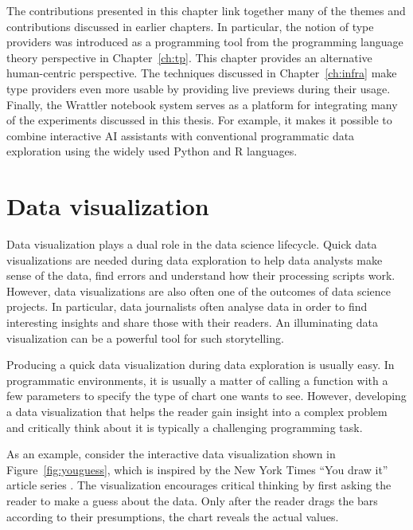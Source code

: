 \documentclass[fleqn,11pt]{report}
\theoremstyle{definition}
\begin{document}
The contributions presented in this chapter link together many of the themes and contributions
discussed in earlier chapters. In particular, the notion of type providers was introduced
as a programming tool from the programming language theory perspective in Chapter~\ref{ch:tp}.
This chapter provides an alternative human-centric perspective. The techniques discussed
in Chapter~\ref{ch:infra} make type providers even more usable by providing live previews during
their usage. Finally, the Wrattler notebook system serves as a platform for integrating
many of the experiments discussed in this thesis. For example, it makes it possible to combine
interactive AI assistants with conventional programmatic data exploration using the widely
used Python and R languages.



\chapter{Data visualization}

Data visualization plays a dual role in the data science lifecycle. Quick data
visualizations are needed during data exploration to help data analysts make sense of the
data, find errors and understand how their processing scripts work. However, data visualizations
are also often one of the outcomes of data science projects. In particular, data journalists
often analyse data in order to find interesting insights and share those with their readers.
An illuminating data visualization can be a powerful tool for such storytelling.

Producing a quick data visualization during data exploration is usually easy. In programmatic
environments, it is usually a matter of calling a function with a few parameters to specify
the type of chart one wants to see. However, developing a data visualization that helps
the reader gain insight into a complex problem and critically think about it is typically
a challenging programming task.

As an example, consider the interactive data visualization shown in Figure~\ref{fig:youguess},
which is inspired by the New York Times ``You draw it'' article series \citep{aisch-2015-youdraw}.
The visualization encourages critical thinking by first asking the reader to make a guess
about the data. Only after the reader drags the bars according to their presumptions, the
chart reveals the actual values.
\end{document}
